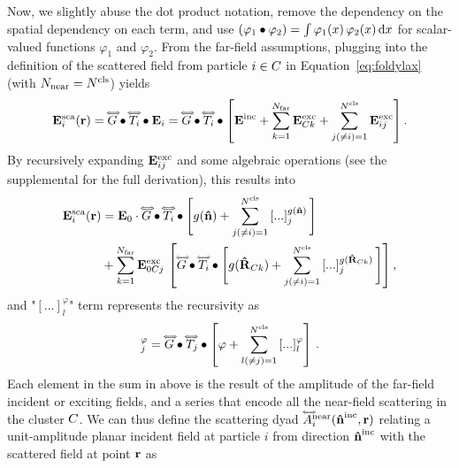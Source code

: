 Now, we slightly abuse the dot product notation, remove the dependency on the spatial dependency on each term, and use $(\varphi_1  \bigcdot{x} \varphi_2) = \int \varphi_1(x)\,\varphi_2(x) \diff x$ for scalar-valued functions $\varphi_1$ and $\varphi_2$. From the far-field assumptions, plugging  into the definition of the scattered field from particle $i\in\Cls$ in Equation~\eqref{eq:foldylax} (with $\Nnear=\Ncls$) yields
%
\begin{equation}
    \label{eq:scafieldcluster1}
    \begin{split}
        \ScaEField_i(\px) = \sGreen  \bigcdot{\px'}  \dyad{T}_i  \bigcdot{\px''} \EField_i
        = \sGreen \bigcdot{\px'} \dyad{T}_i \bigcdot{\px''} \left[\IncEField + \sum_{k=1}^\Nfar \ExcEField_{\Cls k}+ \sum_{j(\neq i)=1}^\Ncls \ExcEField_{ij} \right].
    \end{split}        
\end{equation}
%
By recursively expanding $\ExcEField_{ij}$ and some algebraic operations (see the supplemental for the full derivation), this results into 
\begin{align}
    \label{eq:scafieldcluster5}
    \ScaEField_i(\px) &= \EField_0 \cdot \sGreen \bigcdot{\px'} \dyad{T}_i \bigcdot{\px''} \Bigg[ \sGreenProp(\dw) + \sum_{j(\neq i)=1}^\Ncls \left[...\right]_j^{\sGreenProp(\dw)} \Bigg] \\
    & + \sum_{k=1}^\Nfar \ExcEField_{0\Cls j}\,\left[ \sGreen \bigcdot{\px'} \dyad{T}_i \bigcdot{\px''} \Bigg[ \sGreenProp(\dPx_{\Cls k}) + \sum_{j(\neq i)=1}^\Ncls \left[...\right]_j^{\sGreenProp(\dPx_{\Cls k})}\Bigg]\right], \nonumber 
\end{align}
%
and "$[...]_l^\varphi$" term represents the recursivity as
%
\begin{equation}
    [...]_j^\varphi= \sGreen \bigcdot{\px'} \dyad{T}_j \bigcdot{\px''} \left[\varphi + \sum_{l(\neq j)=1}^\Ncls \left[...\right]_l^\varphi\right] \,.
\end{equation}
%
Each element in the sum in  above is the result of the amplitude of the far-field incident or exciting fields, and a series that encode all the near-field scattering in the cluster $\Cls$. We can thus define the scattering dyad $\ScaDyad_i^\text{near}(\dwi,\px)$ relating a unit-amplitude planar incident field at particle $i$ from direction $\dwi$ with the scattered field at point $\px$ as
